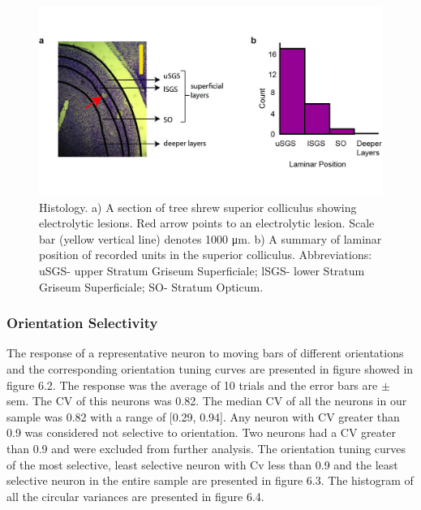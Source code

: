 \documentclass [12pt]{report}
\begin{document}
	\begin{figure}
		
		\includegraphics[width=\linewidth]{anatpos.jpg}
		\caption{Histology. a) A section of tree shrew superior colliculus showing electrolytic lesions. Red arrow
			points to an electrolytic lesion. Scale bar (yellow vertical line) denotes 1000 μm. b) A summary of laminar
			position of recorded units in the superior colliculus. Abbreviations: uSGS- upper Stratum Griseum Superficiale;
			lSGS- lower Stratum Griseum Superficiale; SO- Stratum Opticum.}
		\label{fig:fig1}
	\end{figure}
	
	
	
	\subsubsection{Orientation Selectivity}
	
	The response of a representative neuron to moving bars of different orientations and the corresponding orientation tuning curves are presented in figure showed in figure 6.2. The response was the average of 10 trials and the error bars are $\pm$ sem. The CV of this neurons was 0.82. The median CV of all the neurons in our sample was 0.82 with a range of [0.29, 0.94]. Any neuron with CV greater than 0.9 was considered not selective to orientation. Two neurons had a CV greater than 0.9 and were excluded from further analysis. The orientation tuning curves of the most selective, least selective neuron with Cv less than 0.9 and the least selective neuron in the entire sample are presented in figure 6.3. The histogram of all the circular variances are presented in figure 6.4.
	
\end{document}
